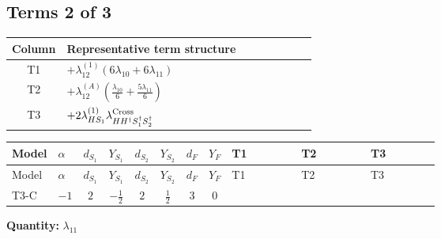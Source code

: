\documentclass[8pt]{article}
\begin{document}
\begin{landscape}
\subsection*{Terms 2 of 3}
\begin{center}
\begin{tabular}{@{}c >{\raggedright\arraybackslash}p{0.82\linewidth}@{}}
\toprule
Column & Representative term structure \\
\midrule
T1 & \(\displaystyle +{\lambda_{12}^{(1)}} (6 {\lambda_{10}}+6 {\lambda_{11}})\) \\
\midrule
T2 & \(\displaystyle +{\lambda_{12}^{(A)}} \left(\frac{{\lambda_{10}}}{6}+\frac{5 {\lambda_{11}}}{6}\right)\) \\
\midrule
T3 & \(\displaystyle +2 {\lambda_{HS_1}^{(1)}} {\lambda_{H H^\dagger S_1^\dagger S_2^\dagger}^{\rm Cross}}\) \\
\midrule
\bottomrule
\end{tabular}
\end{center}
\smallskip
\tiny
\begin{longtable}{@{}llcccccc >{\raggedright\arraybackslash}p{0.21\linewidth} >{\raggedright\arraybackslash}p{0.21\linewidth} >{\raggedright\arraybackslash}p{0.21\linewidth}@{}}
\toprule
Model & $\alpha$ & $d_{S_1}$ & $Y_{S_1}$ & $d_{S_2}$ & $Y_{S_2}$ & $d_F$ & $Y_F$ & T1 & T2 & T3 \\
\midrule
\endfirsthead
\toprule
Model & $\alpha$ & $d_{S_1}$ & $Y_{S_1}$ & $d_{S_2}$ & $Y_{S_2}$ & $d_F$ & $Y_F$ & T1 & T2 & T3 \\
\midrule
\endhead
T3-C & $-1$ & $2$ & $-\frac{1}{2}$ & $2$ & $\frac{1}{2}$ & $3$ & $0$ & \scriptsize\adjustbox{max width=\linewidth}{$\begin{gathered} +{\lambda_{12}^{(1)}} (6 {\lambda_{10}}+6 {\lambda_{11}})\end{gathered}$} & \scriptsize\adjustbox{max width=\linewidth}{$\begin{gathered} +{\lambda_{12}^{(A)}} \left(\frac{{\lambda_{10}}}{6}+\frac{5 {\lambda_{11}}}{6}\right)\end{gathered}$} & \scriptsize\adjustbox{max width=\linewidth}{$\begin{gathered} +2 {\lambda_{HS_1}^{(1)}} {\lambda_{H H^\dagger S_1^\dagger S_2^\dagger}^{\rm Cross}}\end{gathered}$} \\
\midrule
\bottomrule
\end{longtable}
\clearpage
\noindent\textbf{Quantity: }$\lambda_{11}$\par\smallskip

\end{landscape}
\end{document}
